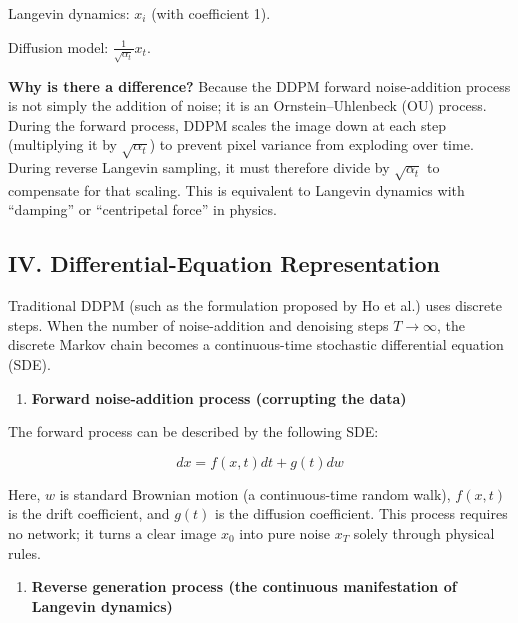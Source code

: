 Langevin dynamics: \(x_i\) (with coefficient 1).

Diffusion model: \(\frac{1}{\sqrt{\alpha_t}}x_t\).

\textbf{Why is there a difference?} Because the DDPM forward noise-addition process is not simply the addition of noise; it is an Ornstein--Uhlenbeck (OU) process. During the forward process, DDPM scales the image down at each step (multiplying it by \(\sqrt{\alpha_t}\)) to prevent pixel variance from exploding over time. During reverse Langevin sampling, it must therefore divide by \(\sqrt{\alpha_t}\) to compensate for that scaling. This is equivalent to Langevin dynamics with ``damping'' or ``centripetal force'' in physics.

\hypertarget{iv.-differential-equation-representation}{%
\subsection{IV. Differential-Equation Representation}\label{iv.-differential-equation-representation}}

Traditional DDPM (such as the formulation proposed by Ho et al.) uses discrete steps. When the number of noise-addition and denoising steps \(T\to\infty\), the discrete Markov chain becomes a continuous-time stochastic differential equation (SDE).

\begin{enumerate}
\def\labelenumi{\arabic{enumi}.}
\tightlist
\item
  \textbf{Forward noise-addition process (corrupting the data)}
\end{enumerate}

The forward process can be described by the following SDE:

\[
dx=f(x,t)dt+g(t)dw
\]

Here, \(w\) is standard Brownian motion (a continuous-time random walk), \(f(x,t)\) is the drift coefficient, and \(g(t)\) is the diffusion coefficient. This process requires no network; it turns a clear image \(x_0\) into pure noise \(x_T\) solely through physical rules.

\begin{enumerate}
\def\labelenumi{\arabic{enumi}.}
\setcounter{enumi}{1}
\tightlist
\item
  \textbf{Reverse generation process (the continuous manifestation of Langevin dynamics)}
\end{enumerate}

